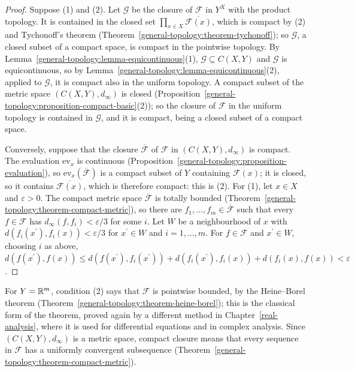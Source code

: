 \begin{proof}
Suppose (1) and (2). Let $\mathcal{G}$ be the closure of $\mathcal{F}$ in $Y^X$ with the product topology. It is contained in the closed set $\prod_{x \in X}\overline{\mathcal{F}(x)}$, which is
compact by (2) and Tychonoff's theorem (Theorem~\ref{general-topology:theorem-tychonoff}); so $\mathcal{G}$, a closed subset of a compact space, is compact in the pointwise topology. By
Lemma~\ref{general-topology:lemma-equicontinuous}(1), $\mathcal{G} \subseteq C(X, Y)$ and $\mathcal{G}$ is equicontinuous, so by Lemma~\ref{general-topology:lemma-equicontinuous}(2), applied to
$\mathcal{G}$, it is compact also in the uniform topology. A compact subset of the metric space $(C(X, Y), d_\infty)$ is closed (Proposition~\ref{general-topology:proposition-compact-basic}(2)); so
the closure of $\mathcal{F}$ in the uniform topology is contained in $\mathcal{G}$, and it is compact, being a closed subset of a compact space.

Conversely, suppose that the closure $\overline{\mathcal{F}}$ of $\mathcal{F}$ in $(C(X, Y), d_\infty)$ is compact. The evaluation $\mathrm{ev}_x$ is continuous
(Proposition~\ref{general-topology:proposition-evaluation}), so $\mathrm{ev}_x(\overline{\mathcal{F}})$ is a compact subset of $Y$ containing $\mathcal{F}(x)$; it is closed, so it contains
$\overline{\mathcal{F}(x)}$, which is therefore compact: this is (2). For (1), let $x \in X$ and $\varepsilon > 0$. The compact metric space $\overline{\mathcal{F}}$ is totally bounded
(Theorem~\ref{general-topology:theorem-compact-metric}), so there are $f_1, \ldots, f_m \in \overline{\mathcal{F}}$ such that every $f \in \mathcal{F}$ has $d_\infty(f, f_i) < \varepsilon/3$ for some
$i$. Let $W$ be a neighbourhood of $x$ with $d(f_i(x^{\prime}), f_i(x)) < \varepsilon/3$ for $x^{\prime} \in W$ and $i = 1, \ldots, m$. For $f \in \mathcal{F}$ and $x^{\prime} \in W$, choosing $i$ as above,
$d(f(x^{\prime}), f(x)) \leq d(f(x^{\prime}), f_i(x^{\prime})) + d(f_i(x^{\prime}), f_i(x)) + d(f_i(x), f(x)) < \varepsilon$.
\end{proof}

For $Y = \mathbb{R}^m$, condition (2) says that $\mathcal{F}$ is pointwise bounded, by the Heine--Borel theorem (Theorem~\ref{general-topology:theorem-heine-borel}); this is the classical form of the theorem,
proved again by a different method in Chapter~\ref{real-analysis}, where it is used for differential equations and in complex analysis. Since $(C(X, Y), d_\infty)$ is a metric space, compact
closure means that every sequence in $\mathcal{F}$ has a uniformly convergent subsequence (Theorem~\ref{general-topology:theorem-compact-metric}).

